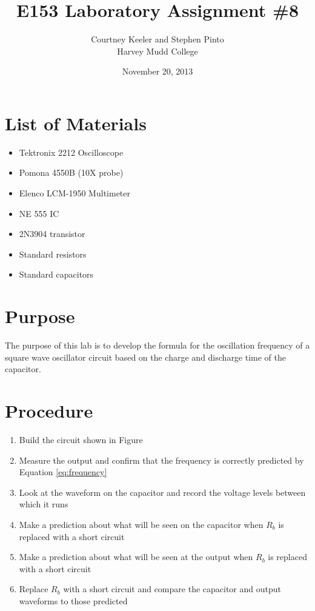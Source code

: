 \documentclass[12pt,letterpaper]{report}
\begin{document}
\title{E153 Laboratory Assignment \#8}
\author{Courtney Keeler and Stephen Pinto\\
Harvey Mudd College}
\date{November 20, 2013}
\maketitle

\section*{List of Materials}
\begin{itemize}
	\item Tektronix 2212 Oscilloscope
	\item Pomona 4550B (10X probe)
	\item Elenco LCM-1950 Multimeter
	\item NE 555 IC
	\item 2N3904 transistor
	\item Standard resistors
	\item Standard capacitors
\end{itemize}

\section*{Purpose}
The purpose of this lab is to develop the formula for the oscillation frequency of a square wave oscillator circuit based on the charge and discharge time of the capacitor.

\section*{Procedure}

\begin{enumerate}
\item Build the circuit shown in Figure %
\item Measure the output and confirm that the frequency is correctly predicted by Equation \ref{eq:frequency}
\item Look at the waveform on the capacitor and record the voltage levels between which it runs
\item Make a prediction about what will be seen on the capacitor when $R_b$ is replaced with a short circuit
\item Make a prediction about what will be seen at the output when $R_b$ is replaced with a short circuit
\item Replace $R_b$ with a short circuit and compare the capacitor and output waveforms to those predicted 
\end{enumerate}
\end{document}
